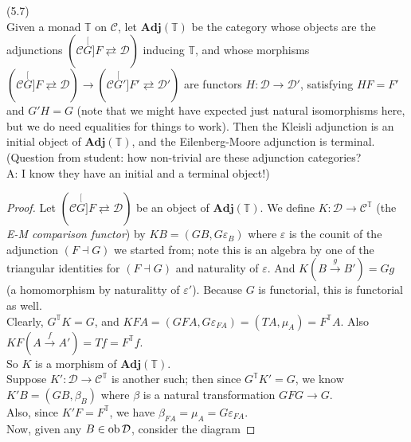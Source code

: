 \documentclass[a4paper]{article}
\begin{document}
\begin{thm} (5.7)\\
    Given a monad $\mathbb{T}$ on $\mathcal{C}$, let $\mathbf{Adj}(\mathbb{T})$ be the category whose objects are the adjunctions $(\mathcal{C}\stackrel[G]{F}{\rightleftarrows} \mathcal{D})$ inducing $\mathbb{T}$, and whose morphisms $(\mathcal{C} \stackrel[G]{F}{\rightleftarrows} \mathcal{D}) \to (\mathcal{C} \stackrel[G']{F'}{\rightleftarrows} \mathcal{D}')$ are functors $H:\mathcal{D} \to \mathcal{D}'$, satisfying $HF = F'$ and $G'H = G$ (note that we might have expected just natural isomorphisms here, but we do need equalities for things to work). Then the Kleisli adjunction is an initial object of $\mathbf{Adj}(\mathbb{T})$, and the Eilenberg-Moore adjunction is terminal.\\
    (Question from student: how non-trivial are these adjunction categories?\\
    A: I know they have an initial and a terminal object!)\\
    \begin{proof}
        Let $(\mathcal{C} \stackrel[G]{F}{\rightleftarrows} \mathcal{D})$ be an object of $\mathbf{Adj}(\mathbb{T})$. We define $K:\mathcal{D} \to \mathcal{C}^\mathbb{T}$ (the \emph{E-M comparison functor}) by $KB = (GB,G\varepsilon_B)$ where $\varepsilon$ is the counit of the adjunction $(F \dashv G)$ we started from; note this is an algebra by one of the triangular identities for $(F\dashv G)$ and naturality of $\varepsilon$. And $K(B\xrightarrow{g}B') = Gg$ (a homomorphism by naturalitty of $\varepsilon'$). Because $G$ is functorial, this is functorial as well.\\
        Clearly, $G^\mathbb{T} K = G$, and $KFA = (GFA,G\varepsilon_{FA}) = (TA,\mu_A)=F^\mathbb{T} A$. Also $KF(A\xrightarrow{f}A') = Tf = F^\mathbb{T} f$.\\
        So $K$ is a morphism of $\mathbf{Adj}(\mathbb{T})$.\\
        Suppose $K':\mathcal{D} \to \mathcal{C}^\mathbb{T}$ is another such; then since $G^\mathbb{T} K' = G$, we know $K'B = (GB,\beta_B)$ where $\beta$ is a natural transformation $GFG \to G$.\\
        Also, since $K'F = F^\mathbb{T}$, we have $\beta_{FA} = \mu_A = G\varepsilon_{FA}$.\\
        Now, given any $B\in\operatorname{ob}\mathcal{D}$, consider the diagram 



\end{proof}
\end{thm}
\end{document}
